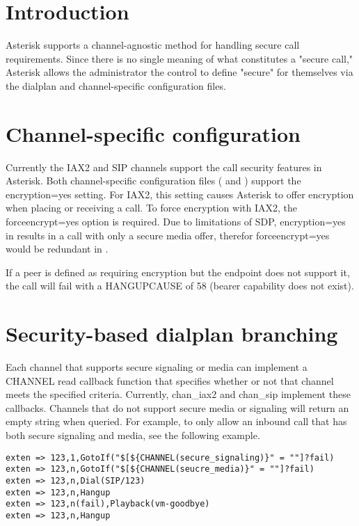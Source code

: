 \section{Introduction}
Asterisk supports a channel-agnostic method for handling secure call requirements. Since there is no single meaning of what constitutes a "secure call," Asterisk allows the administrator the control to define "secure" for themselves via the dialplan and channel-specific configuration files.

\section{Channel-specific configuration}
Currently the IAX2 and SIP channels support the call security features in Asterisk. Both channel-specific configuration files ( and ) support the encryption=yes setting. For IAX2, this setting causes Asterisk to offer encryption when placing or receiving a call. To force encryption with IAX2, the forceencrypt=yes option is required. Due to limitations of SDP, encryption=yes in  results in a call with only a secure media offer, therefor forceencrypt=yes would be redundant in .

If a peer is defined as requiring encryption but the endpoint does not support it, the call will fail with a HANGUPCAUSE of 58 (bearer capability does not exist).


\section{Security-based dialplan branching}
Each channel that supports secure signaling or media can implement a CHANNEL read callback function that specifies whether or not that channel meets the specified criteria. Currently, chan\_iax2 and chan\_sip implement these callbacks. Channels that do not support secure media or signaling will return an empty string when queried. For example, to only allow an inbound call that has both secure signaling and media, see the following example.

\begin{astlisting}
\begin{verbatim}
exten => 123,1,GotoIf("$[${CHANNEL(secure_signaling)}" = ""]?fail)
exten => 123,n,GotoIf("$[${CHANNEL(seucre_media)}" = ""]?fail)
exten => 123,n,Dial(SIP/123)
exten => 123,n,Hangup
exten => 123,n(fail),Playback(vm-goodbye)
exten => 123,n,Hangup
\end{verbatim}
\end{astlisting}

